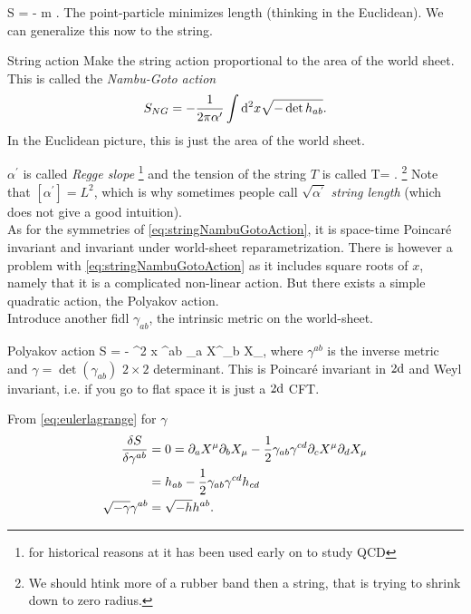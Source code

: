  	\be 
 	\label{eq:StringActionPointParticle}
 	S = - m \int \md \tau{}.
 	\ee 
 	The point-particle minimizes length (thinking in the Euclidean). We can generalize this now to the string.
 	\begin{mybox}{String action}
 		Make the string action proportional to the area of the world sheet. This is called the \emph{Nambu-Goto action}
 		\begin{equation}
 			\label{eq:stringNambuGotoAction}
 			S_{NG} = - \frac{1}{2 \pi \alpha^\prime } \int \mathrm{d}^2 x \sqrt{- \det h_{ab}}.
 		\end{equation}
 		In the Euclidean picture, this is just the area of the world sheet.
 	\end{mybox}
 	$\alpha^\prime$ is called \emph{Regge slope }\footnote{for historical reasons at it has been used early on to study QCD} and the tension of the string $T$ is called 
 	\be 
 	\label{eq:stringTension}
 T=	.
 	\ee
 	\footnote{We should htink more of a rubber band then a string, that is trying to shrink down to zero radius.}
 	Note that $[\alpha^\prime] = L^2$, which is why sometimes people call $\sqrt{\alpha^\prime}$ \emph{string length} (which does not give a good intuition).\\
 As for the symmetries of \ref{eq:stringNambuGotoAction}, it is space-time Poincaré invariant and invariant under world-sheet reparametrization.
 	There is however a problem with \ref{eq:stringNambuGotoAction} as it includes square roots of $x$, namely that it is a complicated non-linear action. But there exists a simple quadratic action, the Polyakov action.\\
 	Introduce another fidl $\gamma_{ab}$, the intrinsic metric on the world-sheet. 
 	\begin{mybox}{Polyakov action}
 		\be 
 		\label{eq:stringPolyakovAction}
 		S = - \int \md^2 x \sqrt{-\gamma} \gamma^{ab} \partial_a X^\mu \partial_b X_\mu,
 		\ee 
 		where $\gamma^{ab}$ is the inverse metric and $\gamma=\det(\gamma_{ab})$ $2 \times2$ determinant. This is Poincaré  invariant in $2\mathrm{d}$ and Weyl invariant, i.e. if you go to flat space it is just a $2 \mathrm{d} $ CFT.
 	\end{mybox}
 	From \ref{eq:eulerlagrange} for $\gamma$ 
 	\begin{align*}
 		\frac{\delta S}{\delta \gamma^{ab }} &=0= \partial_a X^\mu \partial_b X_\mu - \frac{1}{2} \gamma_{ab} \gamma^{cd} \partial_c X^\mu \partial_d X_\mu \\
 		&= h_{ab} -\frac{1}{2} \gamma_{ab} \gamma^{cd} h_{cd}\\
 		\sqrt{-\gamma} \gamma^{ab} & = \sqrt{-h} h^{ab}.
 	\end{align*}
 	 
